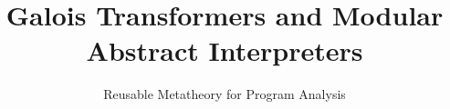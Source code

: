 \documentclass[nocopyrightspace,preprint,10pt]{sigplanconf}
\begin{document}

\setlength{\pdfpageheight}{\paperheight}
\setlength{\pdfpagewidth}{\paperwidth}



%





\newcommand{\zerodisplayskips}{%
  \setlength{\abovedisplayskip}{4pt}
  \setlength{\belowdisplayskip}{4pt}
  \setlength{\abovedisplayshortskip}{0pt}
  \setlength{\belowdisplayshortskip}{0pt}}
\appto{\small}{\zerodisplayskips}

\setlength{\textfloatsep}{8pt}

\title{Galois Transformers and Modular Abstract Interpreters}
\subtitle{Reusable Metatheory for Program Analysis}
\authorinfo{}{}{}
\maketitle
\end{document}
